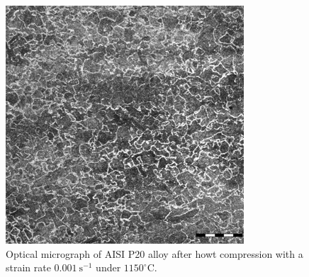 \documentclass[twoside,english,1p,final,sort&compress]{elsarticle}
\theoremstyle{plain}
\begin{document}
\begin{figure}[!ht]
\centering
\includegraphics[width=0.9\columnwidth]
{newFigures/AfterCompM}
\caption{Optical micrograph of AISI P20 alloy after howt compression with a strain rate $0.001\ \text{s}^{-1}$ under $1150^\circ$C.}
\label{fig:AfterCompM}
\end{figure}
\end{document}
